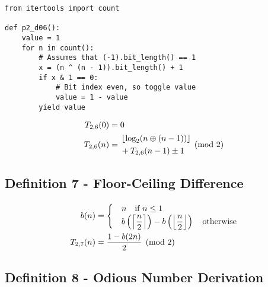 \documentclass[conference]{IEEEtran}
\begin{document}
\noindent\begin{minipage}[H]{0.48\textwidth}\begin{lstlisting}[style=pythonstyle]
from itertools import count

def p2_d06():
    value = 1
    for n in count():
        # Assumes that (-1).bit_length() == 1
        x = (n ^ (n - 1)).bit_length() + 1
        if x & 1 == 0:
            # Bit index even, so toggle value
            value = 1 - value
        yield value
\end{lstlisting}\end{minipage}

\begin{equation}
    \label{eq:p2d06}
    \begin{aligned}
T_{2,6}(0) &= 0 \\
T_{2,6}(n) &= \begin{aligned}[c]
    &\floor{\log_2(n \oplus (n - 1))} \\
    &+ T_{2,6}(n - 1) \pm 1
\end{aligned} \pmod{2}
    \end{aligned}
\end{equation}

\subsection{Definition 7 - Floor-Ceiling Difference}


\begin{equation}
    \label{eq:p2d07}
    \begin{aligned}
      b(n) &= \begin{cases}
          &n \quad \text{if } n \le 1 \\
          &b\left(\ceil{\dfrac{n}{2}}\right) - b\left(\floor{\dfrac{n}{2}}\right) \quad \text{otherwise}
\end{cases} \\
T_{2,7}(n) &= \dfrac{1 - b(2n)}{2} \pmod{2}
    \end{aligned}
\end{equation}


\subsection{Definition 8 - Odious Number Derivation}
\end{document}
